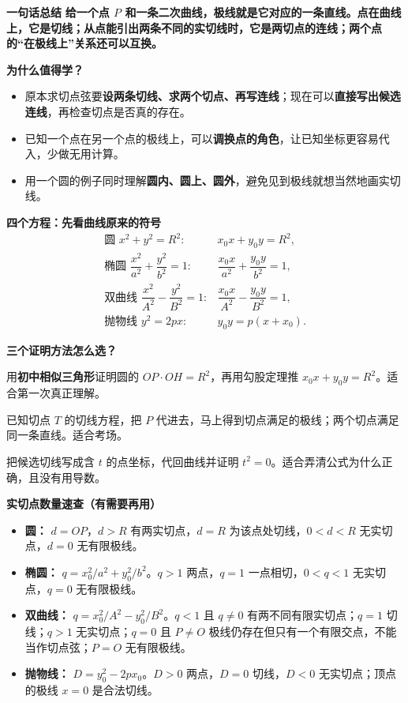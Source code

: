 \begin{summarybox}
\textbf{\textcolor{CSummary}{一句话总结}}
\textbf{给一个点 $P$ 和一条二次曲线，极线就是它对应的一条直线。点在曲线上，它是切线；从点能引出两条不同的实切线时，它是两切点的连线；两个点的“在极线上”关系还可以互换。}

\medskip
\textbf{\textcolor{CSummary}{为什么值得学？}}
\begin{itemize}[leftmargin=*,itemsep=0.25em]
\item 原本求切点弦要\textbf{设两条切线、求两个切点、再写连线}；现在可以\textbf{直接写出候选连线}，再检查切点是否真的存在。
\item 已知一个点在另一个点的极线上，可以\textbf{调换点的角色}，让已知坐标更容易代入，少做无用计算。
\item 用一个圆的例子同时理解\textbf{圆内、圆上、圆外}，避免见到极线就想当然地画实切线。
\end{itemize}

\medskip
\textbf{\textcolor{CSummary}{四个方程：先看曲线原来的符号}}
\[
\begin{array}{ll}
\text{圆 }x^2+y^2=R^2:&\boxed{x_0x+y_0y=R^2},\\[0.45em]
\text{椭圆 }\dfrac{x^2}{a^2}+\dfrac{y^2}{b^2}=1:&\boxed{\dfrac{x_0x}{a^2}+\dfrac{y_0y}{b^2}=1},\\[1.0em]
\text{双曲线 }\dfrac{x^2}{A^2}-\dfrac{y^2}{B^2}=1:&\boxed{\dfrac{x_0x}{A^2}-\dfrac{y_0y}{B^2}=1},\\[1.0em]
\text{抛物线 }y^2=2px:&\boxed{y_0y=p(x+x_0)}.
\end{array}
\]

\medskip
\textbf{\textcolor{CSummary}{三个证明方法怎么选？}}
\begin{description}[style=nextline,leftmargin=2em,itemsep=0.3em]
\item[方法一（门槛最低）：]用\textbf{初中相似三角形}证明圆的 $OP\cdot OH=R^2$，再用勾股定理推 $x_0x+y_0y=R^2$。适合第一次真正理解。
\item[方法二（最快）：]已知切点 $T$ 的切线方程，把 $P$ 代进去，马上得到切点满足的极线；两个切点满足同一条直线。适合考场。
\item[方法三（常规完整）：]把候选切线写成含 $t$ 的点坐标，代回曲线并证明 $t^2=0$。适合弄清公式为什么正确，且没有用导数。
\end{description}

\medskip
\textbf{\textcolor{CSummary}{实切点数量速查（有需要再用）}}
\begin{itemize}[leftmargin=*,itemsep=0.3em]
\item \textbf{圆：} $d=OP$，$d>R$ 有两实切点，$d=R$ 为该点处切线，$0<d<R$ 无实切点，$d=0$ 无有限极线。
\item \textbf{椭圆：} $q=x_0^2/a^2+y_0^2/b^2$。$q>1$ 两点，$q=1$ 一点相切，$0<q<1$ 无实切点，$q=0$ 无有限极线。
\item \textbf{双曲线：} $q=x_0^2/A^2-y_0^2/B^2$。$q<1$ 且 $q\ne0$ 有两不同有限实切点；$q=1$ 切线；$q>1$ 无实切点；$q=0$ 且 $P\ne O$ 极线仍存在但只有一个有限交点，不能当作切点弦；$P=O$ 无有限极线。
\item \textbf{抛物线：} $D=y_0^2-2px_0$。$D>0$ 两点，$D=0$ 切线，$D<0$ 无实切点；顶点的极线 $x=0$ 是合法切线。
\end{itemize}


\end{summarybox}
